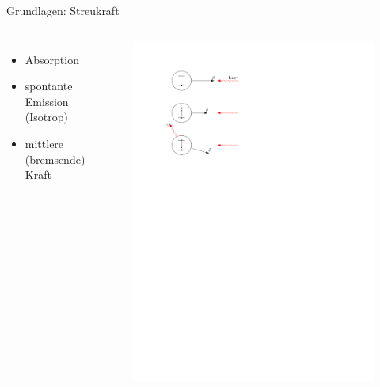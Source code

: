\documentclass[12pt]{beamer}
\begin{document}
\begin{frame}{Grundlagen: Streukraft}
	\begin{columns}[t]
		\begin{itemize}
			\item Absorption
			\item spontante Emission (Isotrop)
			\item mittlere (bremsende) Kraft
		\end{itemize}
		
		\begin{figure}[h]
			\centering
			\includegraphics[width=1.0\textwidth]{./figures/streukraft.pdf}
		\end{figure}
		
	\end{columns}

\end{frame}
\end{document}
